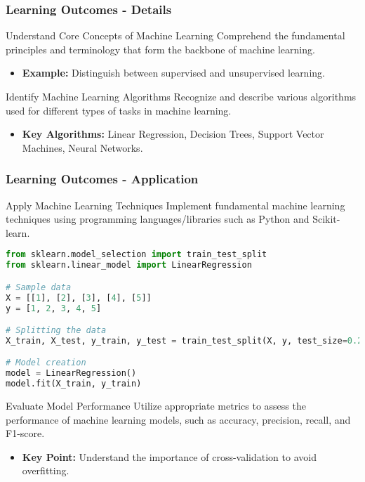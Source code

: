 \documentclass[aspectratio=169]{beamer}
\begin{document}
\begin{frame}[fragile]
    \frametitle{Learning Outcomes - Details}
    \begin{block}{Understand Core Concepts of Machine Learning}
        Comprehend the fundamental principles and terminology that form the backbone of machine learning. 
        \begin{itemize}
            \item \textbf{Example:} Distinguish between supervised and unsupervised learning.
        \end{itemize}
    \end{block}
    
    \begin{block}{Identify Machine Learning Algorithms}
        Recognize and describe various algorithms used for different types of tasks in machine learning. 
        \begin{itemize}
            \item \textbf{Key Algorithms:} Linear Regression, Decision Trees, Support Vector Machines, Neural Networks.
        \end{itemize}
    \end{block}
\end{frame}

\begin{frame}[fragile]
    \frametitle{Learning Outcomes - Application}
    \begin{block}{Apply Machine Learning Techniques}
        Implement fundamental machine learning techniques using programming languages/libraries such as Python and Scikit-learn.
        
        \begin{lstlisting}[language=Python]
from sklearn.model_selection import train_test_split
from sklearn.linear_model import LinearRegression

# Sample data
X = [[1], [2], [3], [4], [5]]
y = [1, 2, 3, 4, 5]

# Splitting the data
X_train, X_test, y_train, y_test = train_test_split(X, y, test_size=0.2, random_state=42)

# Model creation
model = LinearRegression()
model.fit(X_train, y_train)
        \end{lstlisting}
    \end{block}
    
    \begin{block}{Evaluate Model Performance}
        Utilize appropriate metrics to assess the performance of machine learning models, such as accuracy, precision, recall, and F1-score.
        \begin{itemize}
            \item \textbf{Key Point:} Understand the importance of cross-validation to avoid overfitting.
        \end{itemize}
    \end{block}
\end{frame}
\end{document}
